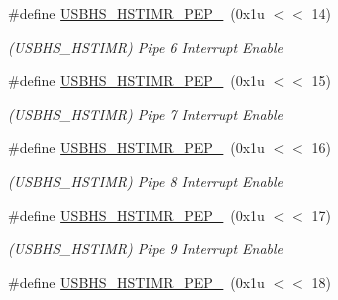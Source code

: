 \begin{DoxyCompactItemize}
\mbox{\label{group__SAME70__USBHS_gad408856b09c79f2fda29bd4d14f8ed41}} 
\#define \mbox{\hyperlink{group__SAME70__USBHS_gad408856b09c79f2fda29bd4d14f8ed41}{U\+S\+B\+H\+S\+\_\+\+H\+S\+T\+I\+M\+R\+\_\+\+P\+E\+P\+\_}}~(0x1u $<$$<$ 14)
\begin{DoxyCompactList}\small\item\em (U\+S\+B\+H\+S\+\_\+\+H\+S\+T\+I\+MR) Pipe 6 Interrupt Enable \end{DoxyCompactList}\item 
\mbox{\label{group__SAME70__USBHS_ga15aaace81792c52e2bf71540dbaee3c6}} 
\#define \mbox{\hyperlink{group__SAME70__USBHS_ga15aaace81792c52e2bf71540dbaee3c6}{U\+S\+B\+H\+S\+\_\+\+H\+S\+T\+I\+M\+R\+\_\+\+P\+E\+P\+\_}}~(0x1u $<$$<$ 15)
\begin{DoxyCompactList}\small\item\em (U\+S\+B\+H\+S\+\_\+\+H\+S\+T\+I\+MR) Pipe 7 Interrupt Enable \end{DoxyCompactList}\item 
\mbox{\label{group__SAME70__USBHS_ga58617dbb47d40379dd6f52bf457b61d0}} 
\#define \mbox{\hyperlink{group__SAME70__USBHS_ga58617dbb47d40379dd6f52bf457b61d0}{U\+S\+B\+H\+S\+\_\+\+H\+S\+T\+I\+M\+R\+\_\+\+P\+E\+P\+\_}}~(0x1u $<$$<$ 16)
\begin{DoxyCompactList}\small\item\em (U\+S\+B\+H\+S\+\_\+\+H\+S\+T\+I\+MR) Pipe 8 Interrupt Enable \end{DoxyCompactList}\item 
\mbox{\label{group__SAME70__USBHS_ga2e7d41188448729a8492aa7c0f3fbb81}} 
\#define \mbox{\hyperlink{group__SAME70__USBHS_ga2e7d41188448729a8492aa7c0f3fbb81}{U\+S\+B\+H\+S\+\_\+\+H\+S\+T\+I\+M\+R\+\_\+\+P\+E\+P\+\_}}~(0x1u $<$$<$ 17)
\begin{DoxyCompactList}\small\item\em (U\+S\+B\+H\+S\+\_\+\+H\+S\+T\+I\+MR) Pipe 9 Interrupt Enable \end{DoxyCompactList}\item 
\mbox{\label{group__SAME70__USBHS_gadf35e21d17ce04631222332ce437d27c}} 
\#define \mbox{\hyperlink{group__SAME70__USBHS_gadf35e21d17ce04631222332ce437d27c}{U\+S\+B\+H\+S\+\_\+\+H\+S\+T\+I\+M\+R\+\_\+\+P\+E\+P\+\_}}~(0x1u $<$$<$ 18)
$$
\end{DoxyCompactItemize}
